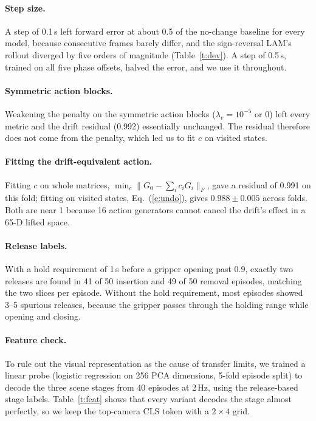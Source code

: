 \paragraph{Step size.}
A step of 0.1\,s left forward error at about 0.5 of the no-change baseline for every model, because consecutive frames barely differ, and the sign-reversal LAM's rollout diverged by five orders of magnitude (Table~\ref{t:dev}).
A step of 0.5\,s, trained on all five phase offsets, halved the error, and we use it throughout.

\paragraph{Symmetric action blocks.}
Weakening the penalty on the symmetric action blocks ($\lambda_v=10^{-5}$ or 0) left every metric and the drift residual (0.992) essentially unchanged.
The residual therefore does not come from the penalty, which led us to fit $c$ on visited states.

\paragraph{Fitting the drift-equivalent action.}
Fitting $c$ on whole matrices, $\min_c\|G_0-\sum_ic_iG_i\|_F$, gave a residual of 0.991 on this fold; fitting on visited states, Eq.~(\ref{e:undo}), gives $0.988\pm0.005$ across folds.
Both are near 1 because 16 action generators cannot cancel the drift's effect in a 65-D lifted space.

\paragraph{Release labels.}
With a hold requirement of 1\,s before a gripper opening past 0.9, exactly two releases are found in 41 of 50 insertion and 49 of 50 removal episodes, matching the two slices per episode.
Without the hold requirement, most episodes showed 3--5 spurious releases, because the gripper passes through the holding range while opening and closing.

\paragraph{Feature check.}
To rule out the visual representation as the cause of transfer limits, we trained a linear probe (logistic regression on 256 PCA dimensions, 5-fold episode split) to decode the three scene stages from 40 episodes at 2\,Hz, using the release-based stage labels.
Table~\ref{t:feat} shows that every variant decodes the stage almost perfectly, so we keep the top-camera CLS token with a $2\times4$ grid.

